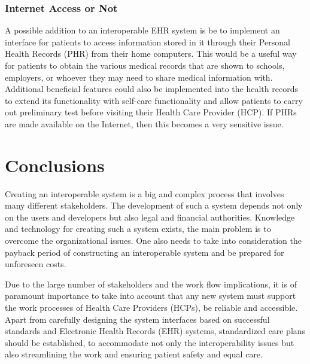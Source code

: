 \documentclass[14pt]{article}
\begin{document}
\subsubsection{Internet Access or Not}%
\label{sec:resultsPHR}
A possible addition to an interoperable \gls{EHR} system is be to implement an interface for patients to access information stored in it through their Personal Health Records (PHR) from their home computers. This would be a useful way for patients to obtain the various medical records that are shown to schools, employers, or whoever they may need to share medical information with. Additional beneficial features could also be implemented into the health records to extend its functionality with self-care functionality and allow patients to carry out preliminary test before visiting their Health Care Provider (HCP). If \glspl{PHR} are made available on the Internet, then this becomes a very sensitive issue.

\newpage

\section{Conclusions}
\label{sec:Conclusions}

Creating an interoperable system is a big and complex process that involves many different stakeholders. The development of such a system depends not only on the users and developers but also legal and financial authorities. Knowledge and technology for creating such a system exists, the main problem is to overcome the organizational issues. One also needs to take into consideration the payback period of constructing an interoperable system and be prepared for unforeseen costs.

Due to the large number of stakeholders and the work flow implications, it is of paramount importance to take into account that any new system must support the work processes of Health Care Providers (HCPs), be reliable and accessible. Apart from carefully designing the system interfaces based on successful standards and Electronic Health Records (EHR) systems, standardized care plans should be established, to accommodate not only the interoperability issues but also streamlining the work and ensuring patient safety and equal care.
\end{document}

